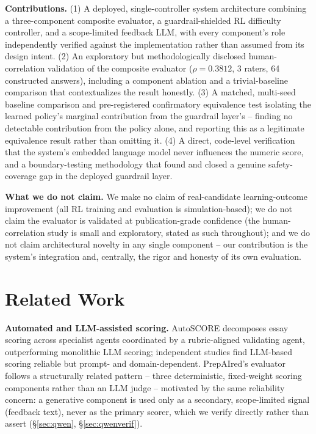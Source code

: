 \documentclass[conference]{IEEEtran}
\begin{document}
\textbf{Contributions.} (1) A deployed, single-controller system architecture combining a three-component composite evaluator, a guardrail-shielded RL difficulty controller, and a scope-limited feedback LLM, with every component's role independently verified against the implementation rather than assumed from its design intent. (2) An exploratory but methodologically disclosed human-correlation validation of the composite evaluator ($\rho = 0.3812$, 3 raters, 64 constructed answers), including a component ablation and a trivial-baseline comparison that contextualizes the result honestly. (3) A matched, multi-seed baseline comparison and pre-registered confirmatory equivalence test isolating the learned policy's marginal contribution from the guardrail layer's -- finding no detectable contribution from the policy alone, and reporting this as a legitimate equivalence result rather than omitting it. (4) A direct, code-level verification that the system's embedded language model never influences the numeric score, and a boundary-testing methodology that found and closed a genuine safety-coverage gap in the deployed guardrail layer.

\textbf{What we do not claim.} We make no claim of real-candidate learning-outcome improvement (all RL training and evaluation is simulation-based); we do not claim the evaluator is validated at publication-grade confidence (the human-correlation study is small and exploratory, stated as such throughout); and we do not claim architectural novelty in any single component -- our contribution is the system's integration and, centrally, the rigor and honesty of its own evaluation.

\section{Related Work}

\textbf{Automated and LLM-assisted scoring.} AutoSCORE \cite{wang2025} decomposes essay scoring across specialist agents coordinated by a rubric-aligned validating agent, outperforming monolithic LLM scoring; independent studies \cite{karjus2026,mendonca2025} find LLM-based scoring reliable but prompt- and domain-dependent. PrepAIred's evaluator follows a structurally related pattern -- three deterministic, fixed-weight scoring components rather than an LLM judge -- motivated by the same reliability concern: a generative component is used only as a secondary, scope-limited signal (feedback text), never as the primary scorer, which we verify directly rather than assert (\S\ref{sec:qwen}, \S\ref{sec:qwenverif}).
\end{document}
